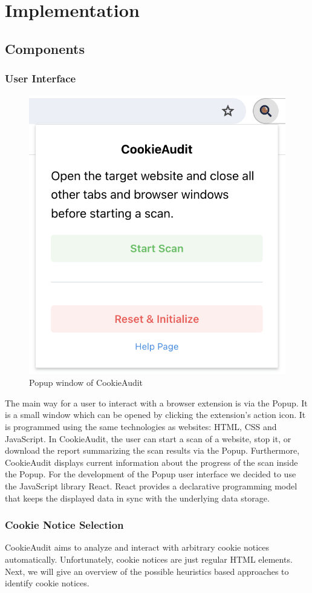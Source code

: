 \chapter{Implementation}

\section{Components}

\subsection{User Interface}
\begin{figure}
	\centering
	\includegraphics[width=0.5\linewidth]{screenshot_popup.png}
	\caption{Popup window of CookieAudit}
	\label{fig:screenshot-popup}
\end{figure}
The main way for a user to interact with a browser extension is via the Popup.
It is a small window which can be opened by clicking the extension's action icon.
It is programmed using the same technologies as websites: HTML, CSS and JavaScript.
In CookieAudit, the user can start a scan of a website, stop it, or download the report summarizing the scan results via the Popup.
Furthermore, CookieAudit displays current information about the progress of the scan inside the Popup.
For the development of the Popup user interface we decided to use the JavaScript library React.
React provides a declarative programming model that keeps the displayed data in sync with the underlying data storage.

\subsection{Cookie Notice Selection}
CookieAudit aims to analyze and interact with arbitrary cookie notices automatically.
Unfortunately, cookie notices are just regular HTML elements.
Next, we will give an overview of the possible heuristics based approaches to identify cookie notices.
